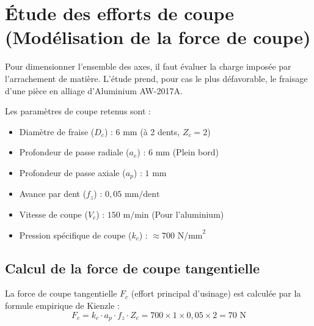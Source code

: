 \section{Étude des efforts de coupe (Modélisation de la force de coupe)}

Pour dimensionner l'ensemble des axes, il faut évaluer la charge imposée par l'arrachement de matière. L'étude prend, pour cas le plus défavorable, le fraisage d'une pièce en alliage d'Aluminium AW-2017A.

Les paramètres de coupe retenus sont :
\begin{itemize}
    \item Diamètre de fraise ($D_c$) : $6 \text{ mm}$ (à 2 dents, $Z_c = 2$)
    \item Profondeur de passe radiale ($a_e$) : $6 \text{ mm}$ (Plein bord)
    \item Profondeur de passe axiale ($a_p$) : $1 \text{ mm}$
    \item Avance par dent ($f_z$) : $0{,}05 \text{ mm/dent}$
    \item Vitesse de coupe ($V_c$) : $150 \text{ m/min}$ (Pour l'aluminium)
    \item Pression spécifique de coupe ($k_c$) : $\approx 700 \text{ N/mm}^2$
\end{itemize}

\subsection{Calcul de la force de coupe tangentielle}
La force de coupe tangentielle $F_c$ (effort principal d'usinage) est calculée par la formule empirique de Kienzle :
\begin{equation}
    F_c = k_c \cdot a_p \cdot f_z \cdot Z_c = 700 \times 1 \times 0{,}05 \times 2 = \boxed{70 \text{ N}}
\end{equation}

